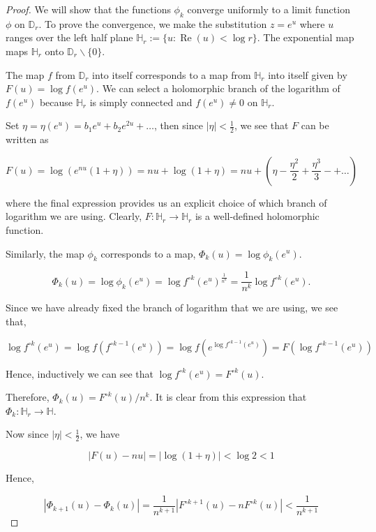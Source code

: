 \begin{proof}
We will show that the functions $\phi_{k}$ converge uniformly to a limit function $\phi$ on $\mathbb{D}_{r}$. To prove the convergence, we make the substitution $z=e^{u}$ where $u$ ranges over the left half plane $\mathbb{H}_{r}:=\{u: \operatorname{Re}(u)<\log r\}$. The exponential map maps $\mathbb{H}_{r}$ onto $\mathbb{D}_{r} \backslash\{0\}$.

The map $f$ from $\mathbb{D}_{r}$ into itself corresponds to a map from $\mathbb{H}_{r}$ into itself given by $F(u)=\log f\left(e^{u}\right)$. We can select a holomorphic branch of the logarithm of $f\left(e^{u}\right)$ because $\mathbb{H}_{r}$ is simply connected and $f\left(e^{u}\right) \neq 0$ on $\mathbb{H}_{r}$.

Set $\eta=\eta\left(e^{u}\right)=b_{1} e^{u}+b_{2} e^{2 u}+\ldots$, then since $|\eta|<\frac{1}{2}$, we see that $F$ can be written as

$$
F(u)=\log \left(e^{n u}(1+\eta)\right)=n u+\log (1+\eta)=n u+\left(\eta-\frac{\eta^{2}}{2}+\frac{\eta^{3}}{3}-+\ldots\right)
$$

where the final expression provides us an explicit choice of which branch of logarithm we are using. Clearly, $F: \mathbb{H}_{r} \rightarrow \mathbb{H}_{r}$ is a well-defined holomorphic function.

Similarly, the map $\phi_{k}$ corresponds to a map, $\Phi_{k}(u)=\log \phi_{k}\left(e^{u}\right)$.

$$
\Phi_{k}(u)=\log \phi_{k}\left(e^{u}\right)=\log f^{\circ k}\left(e^{u}\right)^{\frac{1}{n^{k}}}=\frac{1}{n^{k}} \log f^{\circ k}\left(e^{u}\right) .
$$

Since we have already fixed the branch of logarithm that we are using, we see that,

$$
\log f^{\circ k}\left(e^{u}\right)=\log f\left(f^{\circ k-1}\left(e^{u}\right)\right)=\log f\left(e^{\log f^{\circ k-1}\left(e^{u}\right)}\right)=F\left(\log f^{\circ k-1}\left(e^{u}\right)\right)
$$

Hence, inductively we can see that $\log f^{\circ k}\left(e^{u}\right)=F^{\circ k}(u)$.

Therefore, $\Phi_{k}(u)=F^{\circ k}(u) / n^{k}$. It is clear from this expression that $\Phi_{k}: \mathbb{H}_{r} \rightarrow \mathbb{H}$.

Now since $|\eta|<\frac{1}{2}$, we have

$$
|F(u)-n u|=|\log (1+\eta)|<\log 2<1
$$

Hence,

$$
\left|\Phi_{k+1}(u)-\Phi_{k}(u)\right|=\frac{1}{n^{k+1}}\left|F^{\circ k+1}(u)-n F^{\circ k}(u)\right|<\frac{1}{n^{k+1}}
$$


\end{proof}
